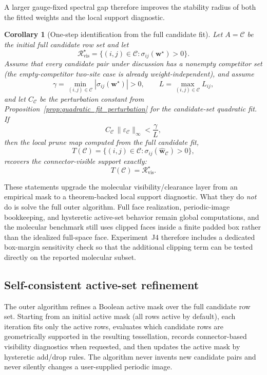\documentclass[preprint,12pt]{elsarticle}
\newtheorem{corollary}{Corollary}
\newcommand{\realpairs}{\mathcal{R}}
\newcommand{\candpairs}{\mathcal{C}}
\newcommand{\weights}{\mathbf{w}}
\begin{document}
A larger gauge-fixed spectral gap therefore improves the stability radius of
both the fitted weights and the local support diagnostic.

\begin{corollary}[One-step identification from the full candidate fit]
\label{cor:one_step_visibility}
Let $A=\candpairs$ be the initial full candidate row set and let
\begin{equation}
    \realpairs^\star_{\mathrm{vis}}
    =\{(i,j)\in\candpairs : \sigma_{ij}(\weights^\star)>0\}.
\end{equation}
Assume that every candidate pair under discussion has a nonempty competitor set
(the empty-competitor two-site case is already weight-independent), and assume
\begin{equation}
    \gamma=\min_{(i,j)\in\candpairs}|\sigma_{ij}(\weights^\star)|>0,
    \qquad
    L=\max_{(i,j)\in\candpairs}L_{ij},
\end{equation}
and let $C_{\candpairs}$ be the perturbation constant from
Proposition~\ref{prop:quadratic_fit_perturbation} for the candidate-set
quadratic fit. If
\begin{equation}
    C_{\candpairs}\,\lVert \varepsilon_{\candpairs}\rVert_\infty < \frac{\gamma}{L},
\end{equation}
then the local prune map computed from the full candidate fit,
\begin{equation}
    T(\candpairs)=\{(i,j)\in\candpairs : \sigma_{ij}(\widehat{\weights}_{\candpairs})>0\},
\end{equation}
recovers the connector-visible support exactly:
\begin{equation}
    T(\candpairs)=\realpairs^\star_{\mathrm{vis}}.
\end{equation}
\end{corollary}

These statements upgrade the molecular visibility/clearance layer from an
empirical mask to a theorem-backed local support diagnostic. What they do
\emph{not} do is solve the full outer algorithm. Full face realization,
periodic-image bookkeeping, and hysteretic active-set behavior remain global
computations, and the molecular benchmark still uses clipped faces inside a
finite padded box rather than the idealized full-space face. Experiment~J4
therefore includes a dedicated box-margin sensitivity check so that the
additional clipping term can be tested directly on the reported molecular
subset.

\subsection{Self-consistent active-set refinement}
The outer algorithm refines a Boolean active mask over the full candidate row
set. Starting from an initial active mask (all rows active by default), each
iteration fits only the active rows, evaluates which candidate rows are
geometrically supported in the resulting tessellation, records connector-based
visibility diagnostics when requested, and then updates the active mask by
hysteretic add/drop rules. The algorithm never invents new candidate pairs and
never silently changes a user-supplied periodic image.
\end{document}
